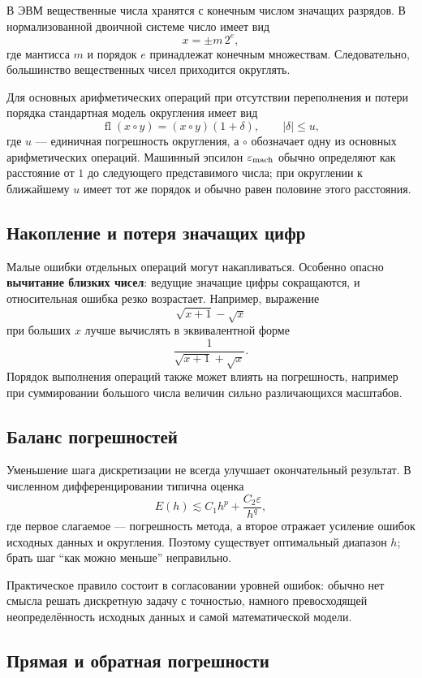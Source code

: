 В ЭВМ вещественные числа хранятся с конечным числом значащих разрядов.
В нормализованной двоичной системе число имеет вид
\[
x=\pm m\,2^e,
\]
где мантисса $m$ и порядок $e$ принадлежат конечным множествам.
Следовательно, большинство вещественных чисел приходится округлять.

Для основных арифметических операций при отсутствии переполнения и
потери порядка стандартная модель округления имеет вид
\[
\boxed{
\operatorname{fl}(x\circ y)
=(x\circ y)(1+\delta),
\qquad |\delta|\le u,
}
\]
где $u$ --- единичная погрешность округления, а $\circ$ обозначает одну из
основных арифметических операций. Машинный эпсилон
$\varepsilon_{\rm mach}$ обычно определяют как расстояние от $1$ до
следующего представимого числа; при округлении к ближайшему $u$ имеет тот
же порядок и обычно равен половине этого расстояния.

\subsection{Накопление и потеря значащих цифр}

Малые ошибки отдельных операций могут накапливаться. Особенно опасно
\textbf{вычитание близких чисел}: ведущие значащие цифры сокращаются, и
относительная ошибка резко возрастает. Например, выражение
\[
\sqrt{x+1}-\sqrt{x}
\]
при больших $x$ лучше вычислять в эквивалентной форме
\[
\frac{1}{\sqrt{x+1}+\sqrt{x}}.
\]
Порядок выполнения операций также может влиять на погрешность, например при
суммировании большого числа величин сильно различающихся масштабов.

\subsection{Баланс погрешностей}

Уменьшение шага дискретизации не всегда улучшает окончательный результат.
В численном дифференцировании типична оценка
\[
E(h)\lesssim C_1h^p+\frac{C_2\varepsilon}{h^q},
\]
где первое слагаемое --- погрешность метода, а второе отражает усиление
ошибок исходных данных и округления. Поэтому существует оптимальный
диапазон $h$; брать шаг ``как можно меньше'' неправильно.

Практическое правило состоит в согласовании уровней ошибок: обычно нет
смысла решать дискретную задачу с точностью, намного превосходящей
неопределённость исходных данных и самой математической модели.


\subsection{Прямая и обратная погрешности}

